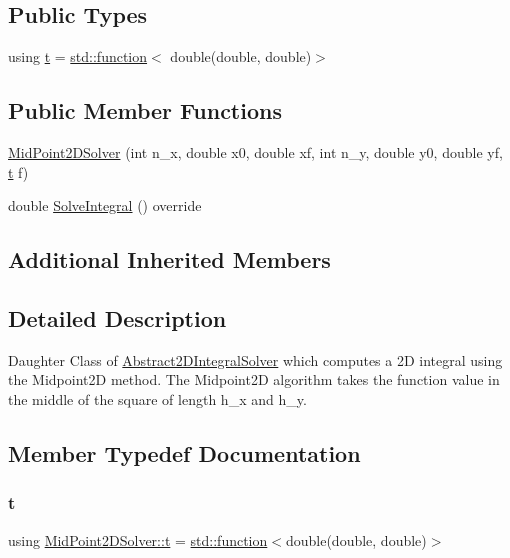 \subsection*{Public Types}
\begin{DoxyCompactItemize}
\item 
using \hyperlink{class_mid_point2_d_solver_a1f2d1dcde9b60f07f70d3e8581635714}{t} = \hyperlink{_tests_8cpp_a1c2dbde1ba7d93e381d4ccb9f603be16}{std\+::function}$<$ double(double, double)$>$
\end{DoxyCompactItemize}
\subsection*{Public Member Functions}
\begin{DoxyCompactItemize}
\item 
\hyperlink{class_mid_point2_d_solver_a9cc9f211031ce410a2fe5287db720460}{Mid\+Point2\+D\+Solver} (int n\+\_\+x, double x0, double xf, int n\+\_\+y, double y0, double yf, \hyperlink{class_abstract2_d_integral_solver_ab660df32953c6b0f9f3a45a8720eaeb3}{t} f)
\item 
double \hyperlink{class_mid_point2_d_solver_a45c6c6802b7d40c35f1f60f1a39f5042}{Solve\+Integral} () override
\end{DoxyCompactItemize}
\subsection*{Additional Inherited Members}


\subsection{Detailed Description}
Daughter Class of \hyperlink{class_abstract2_d_integral_solver}{Abstract2\+D\+Integral\+Solver} which computes a 2D integral using the Midpoint2D method. The Midpoint2D algorithm takes the function value in the middle of the square of length h\+\_\+x and h\+\_\+y. 

\subsection{Member Typedef Documentation}
\mbox{\label{class_mid_point2_d_solver_a1f2d1dcde9b60f07f70d3e8581635714}} 
\subsubsection{\texorpdfstring{t}{t}}
{\footnotesize\ttfamily using \hyperlink{class_mid_point2_d_solver_a1f2d1dcde9b60f07f70d3e8581635714}{Mid\+Point2\+D\+Solver\+::t} =  \hyperlink{_tests_8cpp_a1c2dbde1ba7d93e381d4ccb9f603be16}{std\+::function}$<$double(double, double)$>$}

